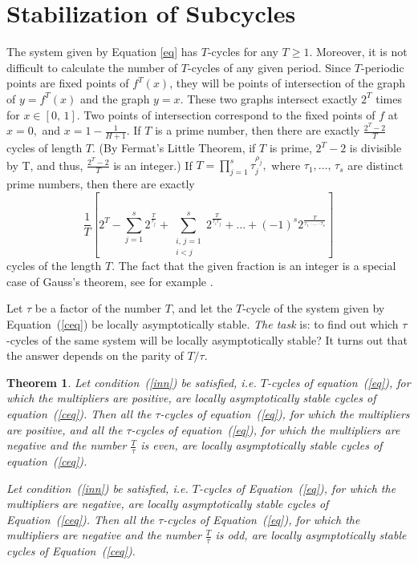 \documentclass[12pt,a4paper]{amsart}
\newtheorem{theorem}{Theorem}
\begin{document}
\section{Stabilization of Subcycles} \label{sec:Subcycles}

The system given by Equation \eqref{eq} has $T$-cycles for any $T \geq 1$.  Moreover, it is not difficult to calculate the number of $T$-cycles of any given period. Since $T$-periodic points are fixed points of $f^T(x)$, they will be points of intersection of the graph of $y = f^T(x)$ and the graph $y = x$.  These two graphs intersect exactly $2^T$ times for $x\in[0,\,1]$. Two points of intersection correspond to 
the fixed points of $f$ at $x=0,$ and $x = 1 - \frac{1}{H+1}$. 
If $T$ is a prime number, then there are exactly $\frac{2^T - 2}{T}$ cycles of length $T$. (By Fermat's Little Theorem, if $T$ is prime, $2^T-2$ is divisible by T, and thus, $\frac{2^{T}-2}{T}$ is an integer.) If $T = \prod\limits_{j=1}^{s} {\tau_{j}^{\rho_j}},$ where $\tau_1,\ldots,\,\tau_s$ are distinct prime numbers, 
then there are exactly 
$$\frac{1}{T} \left[{2^T - \sum\limits_{j=1}^{s}{2^\frac{T}{\tau_j}} + \sum\limits_{\substack{i,\,j=1 \\ i<j}}^{s}{2^\frac{T}{\tau_i \tau_j}} + \ldots +
(-1)^s 2^\frac{T}{\tau_1 \cdot \ldots \cdot \tau_s}}\right]$$
cycles of the length $T.$ The fact that the given fraction is an integer is a special case of 
Gauss's theorem, see for example \cite[p.84]{Dixon}.

Let $\tau$ be a factor of the number $T$, and let the $T$-cycle of the system given by Equation~(\ref{ceq}) 
be locally asymptotically stable. \textit{The task} is: to find out which $\tau$-cycles of the same system will be locally asymptotically stable?  It turns out that the answer depends on the parity of $T/\tau$.

\begin{theorem}\label{t4}
Let condition~(\ref{inn}) be satisfied, i.e. $T$-cycles of equation~(\ref{eq}), for which the multipliers are positive, are locally asymptotically stable cycles 
of equation~(\ref{ceq}). Then all the $\tau$-cycles of equation~(\ref{eq}), for which the multipliers are positive, and all the $\tau$-cycles of 
equation~(\ref{eq}), for which the multipliers are negative and the number $\frac{T}{\tau}$ is even, are locally asymptotically stable cycles of 
equation~(\ref{ceq}).

Let condition~(\ref{inn}) be satisfied, i.e. $T$-cycles of Equation~(\ref{eq}), for which the multipliers are negative, are locally asymptotically stable cycles 
of Equation~(\ref{ceq}). Then all the $\tau$-cycles of Equation~(\ref{eq}), for which the multipliers are negative and the number $\frac{T}{\tau}$ is odd, 
are locally asymptotically stable cycles of Equation~(\ref{ceq}).
\end{theorem}
\end{document}
